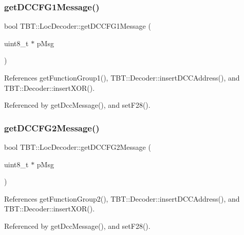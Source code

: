 \subsubsection{\texorpdfstring{get\+D\+C\+C\+F\+G1\+Message()}{getDCCFG1Message()}}
{\footnotesize\ttfamily bool T\+B\+T\+::\+Loc\+Decoder\+::get\+D\+C\+C\+F\+G1\+Message (\begin{DoxyParamCaption}\item[{uint8\+\_\+t $\ast$}]{p\+Msg }\end{DoxyParamCaption})\hspace{0.3cm}{\ttfamily [protected]}}



References get\+Function\+Group1(), T\+B\+T\+::\+Decoder\+::insert\+D\+C\+C\+Address(), and T\+B\+T\+::\+Decoder\+::insert\+X\+O\+R().



Referenced by get\+Dcc\+Message(), and set\+F28().

\mbox{\label{classTBT_1_1LocDecoder_a7901f5894517bb5218d6955e74348f4b_a7901f5894517bb5218d6955e74348f4b}} 
\subsubsection{\texorpdfstring{get\+D\+C\+C\+F\+G2\+Message()}{getDCCFG2Message()}}
{\footnotesize\ttfamily bool T\+B\+T\+::\+Loc\+Decoder\+::get\+D\+C\+C\+F\+G2\+Message (\begin{DoxyParamCaption}\item[{uint8\+\_\+t $\ast$}]{p\+Msg }\end{DoxyParamCaption})\hspace{0.3cm}{\ttfamily [protected]}}



References get\+Function\+Group2(), T\+B\+T\+::\+Decoder\+::insert\+D\+C\+C\+Address(), and T\+B\+T\+::\+Decoder\+::insert\+X\+O\+R().



Referenced by get\+Dcc\+Message(), and set\+F28().

\mbox{\label{classTBT_1_1LocDecoder_a15c5dcaf68e2ea8522ad81ae7c897d3f_a15c5dcaf68e2ea8522ad81ae7c897d3f}} 
